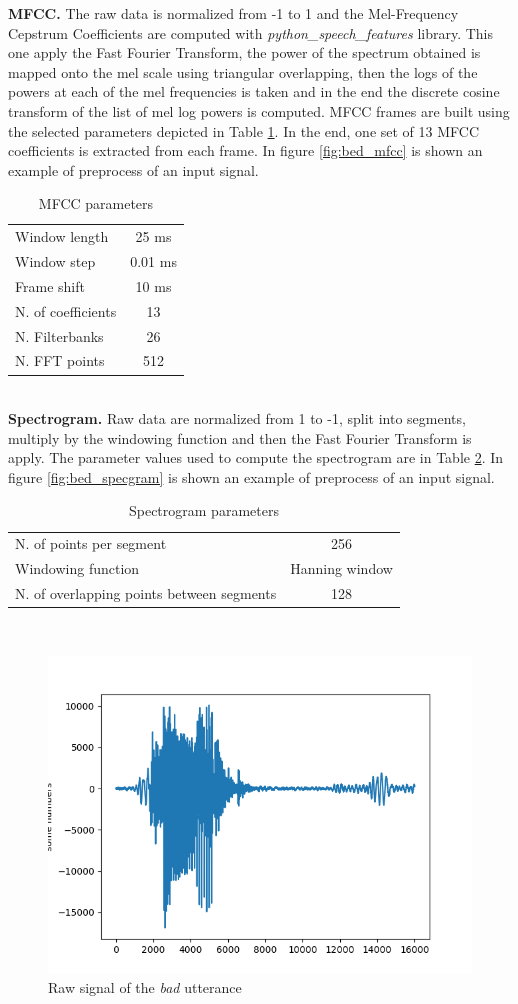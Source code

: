\noindent \textbf{MFCC.} The raw data is normalized from -1 to 1 and the Mel-Frequency Cepstrum Coefficients are computed with \textit{python\_speech\_features} library. This one apply the Fast Fourier Transform, the power of the spectrum obtained is mapped onto the mel scale using triangular overlapping, then the logs of the powers at each of the mel frequencies is taken and in the end the discrete cosine transform of the list of mel log powers is computed. MFCC frames are built using the selected parameters depicted in Table \ref{table:mfcc_parameters}.
\noindent In the end, one set of 13 MFCC coefficients is extracted from each frame. In figure \ref{fig:bed_mfcc} is shown an example of preprocess of an input signal.
\begin{table}[h]
	\centering
	\begin{tabular}{ |l|c|}
		\hline
		Window length & 25 ms        \\
		Window step & 0.01 ms        \\
		Frame shift  & 10 ms         \\
		N. of coefficients & 13 \\
		N. Filterbanks & 26         \\
		N. FFT points & 512         \\
		\hline
	\end{tabular}
	\caption{MFCC parameters}
	\label{table:mfcc_parameters} 
\end{table}\\
\noindent \textbf{Spectrogram.} Raw data are normalized from 1 to -1, split into segments, multiply by the windowing function and then the Fast Fourier Transform is apply.
The parameter values used to compute the spectrogram are in Table \ref{table:specgram_parameters}. In figure \ref{fig:bed_specgram} is shown an example of preprocess of an input signal.
\begin{table}[h]
	\centering
	\begin{tabular}{ |l|c| }
		\hline
		N. of points per segment & 256 \\
		Windowing function & Hanning window \\
		N. of overlapping points between segments & 128 \\
		\hline
	\end{tabular}
	\caption{Spectrogram parameters}
	\label{table:specgram_parameters} 
\end{table}\\

\begin{figure}
	\centering
	\includegraphics[width=.5\textwidth]{img/bed_rawsignal_plot.png}
	\caption{Raw signal of the \textit{bad} utterance}
	\label{fig:bed_rawsignal}
\end{figure}


